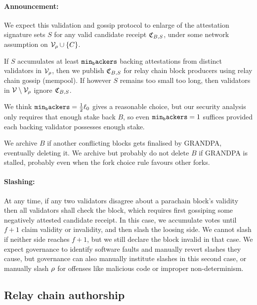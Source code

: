 \smallskip\paragraph{Announcement:}

We expect this validation and gossip protocol to enlarge of the attestation signature sets $S$ for any valid candidate receipt $\mathfrak{C}_{B,S}$, under some network assumption on $\mathcal{V}_{\rho} \cup \{C\}$.

If $S$ accumulates at least $\mathtt{min_backers}$ backing attestations from distinct validators in $\mathcal{V}_{\rho}$, then we publish $\mathfrak{C}_{B,S}$ for relay chain block producers using relay chain gossip (mempool).
If however $S$ remains too small too long, then validators in $\mathcal{V} \setminus \mathcal{V}_{\rho}$ ignore $\mathfrak{C}_{B,S}$.

We think $\mathtt{min_backers} = {1\over2} \ell_0$ gives a reasonable choice, but our security analysis only requires that enough stake back $B$, so even $\mathtt{min_backers} = 1$ suffices provided each backing validator possesses enough stake.

We archive $B$ if another conflicting blocks gets finalised by GRANDPA, eventually deleting it.  We archive but probably do not delete $B$ if GRANDPA is stalled, probably even when the fork choice rule favours other forks. 

\smallskip\paragraph{Slashing:}

At any time, if any two validators disagree about a parachain block's validity then all validators shall check the block, which requires first gossiping some negatively attested candidate receipt.  In this case, we accumulate votes until $f+1$ claim validity or invalidity, and then slash the loosing side.  We cannot slash if neither side reaches $f+1$, but we still declare the block invalid in that case.  We expect governance to identify software faults and manually revert slashes they cause, but governance can also manually institute slashes in this second case, or manually slash $\rho$ for offenses like malicious code or improper non-determinism. 


\subsection{Relay chain authorship} %
\label{sec:authorship}

